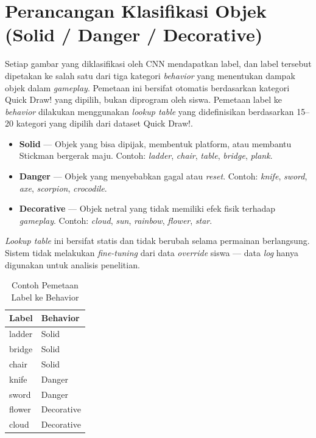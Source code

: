 \documentclass[10pt,twoside,openright]{report}
\begin{document}
\section{Perancangan Klasifikasi Objek (Solid / Danger / Decorative)}
\label{sec:perancangan-klasifikasi-objek}

Setiap gambar yang diklasifikasi oleh CNN mendapatkan label, dan label tersebut dipetakan ke salah satu dari tiga kategori \textit{behavior} yang menentukan dampak objek dalam \textit{gameplay}. Pemetaan ini bersifat otomatis berdasarkan kategori Quick Draw! yang dipilih, bukan diprogram oleh siswa. Pemetaan label ke \textit{behavior} dilakukan menggunakan \textit{lookup table} yang didefinisikan berdasarkan 15--20 kategori yang dipilih dari dataset Quick Draw!.

\begin{itemize}
    \item \textbf{Solid} --- Objek yang bisa dipijak, membentuk platform, atau membantu Stickman bergerak maju. Contoh: \textit{ladder}, \textit{chair}, \textit{table}, \textit{bridge}, \textit{plank}.
    \item \textbf{Danger} --- Objek yang menyebabkan gagal atau \textit{reset}. Contoh: \textit{knife}, \textit{sword}, \textit{axe}, \textit{scorpion}, \textit{crocodile}.
    \item \textbf{Decorative} --- Objek netral yang tidak memiliki efek fisik terhadap \textit{gameplay}. Contoh: \textit{cloud}, \textit{sun}, \textit{rainbow}, \textit{flower}, \textit{star}.
\end{itemize}

\textit{Lookup table} ini bersifat statis dan tidak berubah selama permainan berlangsung. Sistem tidak melakukan \textit{fine-tuning} dari data \textit{override} siswa --- data \textit{log} hanya digunakan untuk analisis penelitian.

\begin{table}[ht]
\centering
\caption{Contoh Pemetaan Label ke Behavior}
\label{tab:behavior-mapping}
\begin{tabular}{|l|l|}
\hline
\textbf{Label} & \textbf{Behavior} \\ \hline
ladder & Solid \\ \hline
bridge & Solid \\ \hline
chair & Solid \\ \hline
knife & Danger \\ \hline
sword & Danger \\ \hline
flower & Decorative \\ \hline
cloud & Decorative \\ \hline
\end{tabular}
\end{table}
\end{document}
